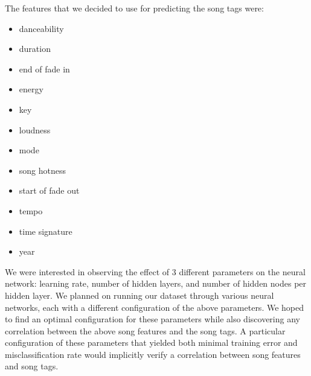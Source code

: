 \documentclass[12pt]{article}
\begin{document}
The features that we decided to use for predicting the song tags were: 
\begin{itemize}
    \item danceability
    \vspace{-3.5mm}
    \item duration
    \vspace{-3.5mm}
    \item end of fade in
    \vspace{-3.5mm}
    \item energy
    \vspace{-3.5mm}
    \item key
    \vspace{-3.5mm}
    \item loudness
    \vspace{-3.5mm}
    \item mode
    \vspace{-3.5mm}
    \item song hotness
    \vspace{-3.5mm}
    \item start of fade out
    \vspace{-3.5mm} 
    \item tempo
    \vspace{-3.5mm}
    \item time signature
    \vspace{-3.5mm}
    \item year
\end{itemize}

We were interested in observing the effect of 3 different parameters on the neural network: learning rate, number of hidden layers, and number of hidden nodes per hidden layer. We planned on running our dataset through various neural networks, each with a different configuration of the above parameters. We hoped to find an optimal configuration for these parameters while also discovering any correlation between the above song features and the song tags. A particular configuration of these parameters that yielded both minimal training error and misclassification rate would implicitly verify a correlation between song features and song tags.

\end{document}
